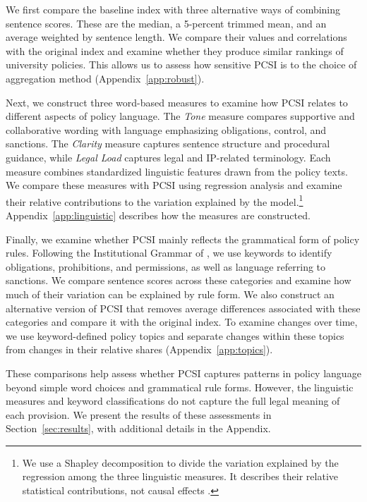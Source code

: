 \documentclass[11pt]{article}
\begin{document}
We first compare the baseline index with three alternative ways of combining sentence scores. These are the median, a 5-percent trimmed mean, and an average weighted by sentence length. We compare their values and correlations with the original index and examine whether they produce similar rankings of university policies. This allows us to assess how sensitive PCSI is to the choice of aggregation method (Appendix~\ref{app:robust}).

Next, we construct three word-based measures to examine how PCSI relates to different aspects of policy language. The \emph{Tone} measure compares supportive and collaborative wording with language emphasizing obligations, control, and sanctions. The \emph{Clarity} measure captures sentence structure and procedural guidance, while \emph{Legal Load} captures legal and IP-related terminology. Each measure combines standardized linguistic features drawn from the policy texts. We compare these measures with PCSI using regression analysis and examine their relative contributions to the variation explained by the model.\footnote{We use a Shapley decomposition to divide the variation explained by the regression among the three linguistic measures. It describes their relative statistical contributions, not causal effects \citep{groemping2006relative}.} Appendix~\ref{app:linguistic} describes how the measures are constructed.

Finally, we examine whether PCSI mainly reflects the grammatical form of policy rules. Following the Institutional Grammar of \citet{crawford1995grammar}, we use keywords to identify obligations, prohibitions, and permissions, as well as language referring to sanctions. We compare sentence scores across these categories and examine how much of their variation can be explained by rule form. We also construct an alternative version of PCSI that removes average differences associated with these categories and compare it with the original index. To examine changes over time, we use keyword-defined policy topics and separate changes within these topics from changes in their relative shares (Appendix~\ref{app:topics}).

These comparisons help assess whether PCSI captures patterns in policy language beyond simple word choices and grammatical rule forms. However, the linguistic measures and keyword classifications do not capture the full legal meaning of each provision. We present the results of these assessments in Section~\ref{sec:results}, with additional details in the Appendix.
\end{document}
